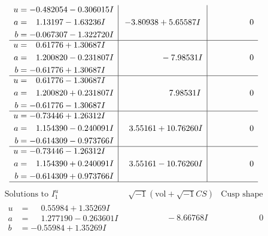 \documentclass[1p]{elsarticle_modified}
\theoremstyle{definition}
\newcommand{\I}{\sqrt{-1}}
\begin{document}
$$\begin{array}{c|c|c}
\begin{aligned}
u &= -0.482054 - 0.306015 I \\
a &= \phantom{-}1.13197 - 1.63236 I \\
b &= -0.067307 - 1.322720 I\end{aligned}
 & -3.80938 + 5.65587 I & \phantom{-0.000000 } 0 \\ \hline\begin{aligned}
u &= \phantom{-}0.61776 + 1.30687 I \\
a &= \phantom{-}1.200820 - 0.231807 I \\
b &= -0.61776 + 1.30687 I\end{aligned}
 & \phantom{-0.000000 } -7.98531 I & \phantom{-0.000000 } 0 \\ \hline\begin{aligned}
u &= \phantom{-}0.61776 - 1.30687 I \\
a &= \phantom{-}1.200820 + 0.231807 I \\
b &= -0.61776 - 1.30687 I\end{aligned}
 & \phantom{-0.000000 -}7.98531 I & \phantom{-0.000000 } 0 \\ \hline\begin{aligned}
u &= -0.73446 + 1.26312 I \\
a &= \phantom{-}1.154390 - 0.240091 I \\
b &= -0.614309 - 0.973766 I\end{aligned}
 & \phantom{-}3.55161 + 10.76260 I & \phantom{-0.000000 } 0 \\ \hline\begin{aligned}
u &= -0.73446 - 1.26312 I \\
a &= \phantom{-}1.154390 + 0.240091 I \\
b &= -0.614309 + 0.973766 I\end{aligned}
 & \phantom{-}3.55161 - 10.76260 I & \phantom{-0.000000 } 0\\
 \hline 
 \end{array}$$\newpage$$\begin{array}{c|c|c}  
\text{Solutions to }I^u_{1}& \I (\text{vol} + \sqrt{-1}CS) & \text{Cusp shape}\\
 \hline 
\begin{aligned}
u &= \phantom{-}0.55984 + 1.35269 I \\
a &= \phantom{-}1.277190 - 0.263601 I \\
b &= -0.55984 + 1.35269 I\end{aligned}
 & \phantom{-0.000000 } -8.66768 I & \phantom{-0.000000 } 0 \\ \hline\begin{aligned}

\end{aligned}
\end{array}$$
\end{document}
